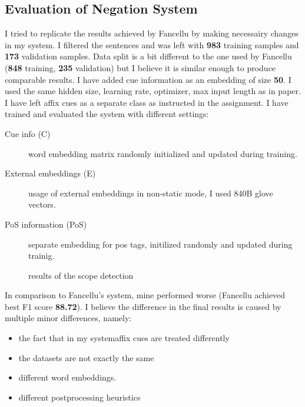 \documentclass{article}
\begin{document}
\subsection{Evaluation of Negation System}
I tried to replicate the results achieved by Fancellu by making necessairy changes in my system.
I filtered the sentences and was left with \textbf{983} training samples and \textbf{173} validation samples.
Data split is a bit different to the one used by Fancellu (\textbf{848} training, \textbf{235} validation) but
I believe it is similar enough to produce comparable results. I have added cue information as an embedding
of size \textbf{50}. I used the same hidden size, learning rate, optimizer, max input length as in paper.
I have left affix cues as a separate class as instructed in the assignment.
I have trained and evaluated the system with different settings:
\begin{description}
\item[Cue info (C)] word embedding matrix randomly initialized and updated during training.
\item[External embeddings (E)] usage of external embeddings in non-static mode, I used 840B glove vectors.
\item[PoS information (PoS)] separate embedding for pos tags, initilized randomly and updated during trainig.
\end{description}

\begin{figure}[h]

\caption{results of the scope detection}
\end{figure}

In comparison to Fancellu's system, mine performed worse (Fancellu achieved best F1 score \textbf{88.72}).
I believe the difference in the final results is caused by multiple minor differences, namely:
\begin{itemize}
\item the fact that in my systemaffix cues are treated differently
\item the datasets are not exactly the same
\item different word embeddings.
\item different postprocessing heuristics
\end{itemize}
\newpage
\end{document}
